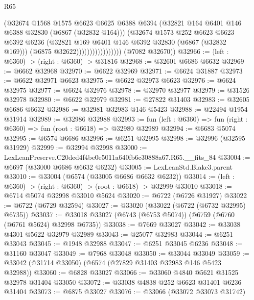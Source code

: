 \begin{lexlean}{R65}
\begin{coremodule}
{                                  (@32674
                                    @1568
                                    @1575
                                    @6623
                                    @6625
                                    @6388
                                    @6394
                                    (@32821 @164 @6401 @146 @6388 @32830 (@6867 (@32832 @164)))
                                    (@32674
                                      @1573
                                      @252
                                      @6623
                                      @6623
                                      @6392
                                      @6236
                                      (@32821 @169 @6401 @146 @6392 @32830 (@6867 (@32832 @169)))
                                      (@6875 @32622)))))))))))))))))
      (@7082 @32670))
@32966 := (left : @6360) -> (right : @6360) -> @31816
@32968 := @32601 @6686 @6632
@32969 := @6662 @32968
@32970 := @6622 @32969
@32971 := @6624 @31887
@32973 := @6622 @32971 @6623
@32975 := @6622 @32973 @6623
@32976 := @6624 @32975
@32977 := @6624 @32976
@32978 := @32970 @32977
@32979 := @31526 @32978
@32980 := @6622 @32979
@32981 := @27822 @31403
@32983 := @32605 @6686 @6632
@32986 := @32981 @32983 @146 @5423
@32988 := @22494 @1954 @31914
@32989 := @32986 @32988
@32993 := fun (left : @6360) => fun (right : @6360) => fun (root : @6618) => @32980 @32989
@32994 := @6683 @5074
@32995 := @6574 @6686
@32996 := @6251 @32995
@32998 := @32996 (@32595 @31929)
@32999 := @32994 @32998
@33000 := LexLeanPreserve.C20ded4f4be0e5011a640fb6c30888a67.R65.__fits_84
@33004 := @6697 (@33000 @6686 @6632 @6232)
@33005 := LexLeanStd.Blake3.parent
@33010 := @33004 (@6574 (@33005 @6686 @6632 @6232))
@33014 := (left : @6360) -> (right : @6360) -> (root : @6618) -> @32999 @33010
@33018 := @6714 @5074 @32998 @33010 @5624
@33020 := @6722 (@6726 @31927)
@33022 := @6722 (@6729 @32594)
@33027 := @33020 (@33022 (@6722 (@6732 @32995) @6735))
@33037 := @33018 @33027 (@6743 (@6753 @5074)) (@6759 (@6760 (@6761 @5624) @32998 @6735))
@33038 := @7669 @33027
@33042 := @33038 @4301 @5622 @32979 @32989
@33043 := @25077 @32983
@33044 := @6251 @33043
@33045 := @1948 @32988
@33047 := @6251 @33045 @6236
@33048 := @31160 @33047
@33049 := @7968 @33048
@33050 := @33044 @33049
@33059 := @33042 (@31714 @33050) (@6574 (@27829 @31403 @32983 @146 @5423 @32988))
@33060 := @6828 @33027
@33066 := @33060 @4840 @5621 @31525 @32978 @31404 @33050
@33072 := @33038 @4838 @252 @6623 @31401 @6236 @31404
@33073 := @6875 @33027
@33076 := @33066 (@33072 @33073 @31742)
}
\end{coremodule}
\end{lexlean}

